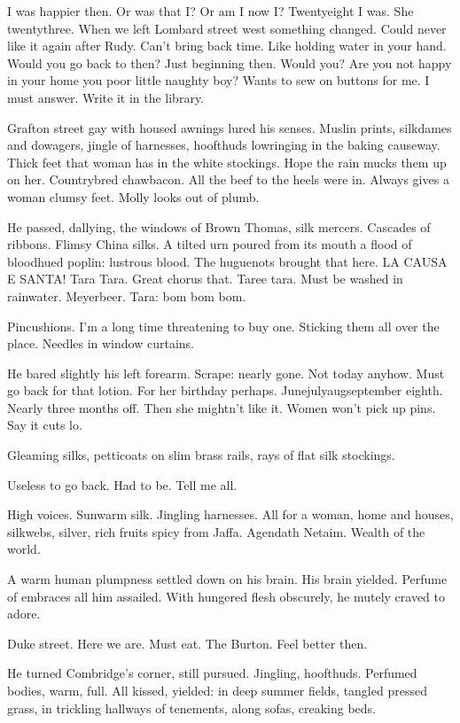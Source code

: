 I was happier then.
Or was that I?
Or am I now I?
Twentyeight I was.
She twentythree.
When we left Lombard street west something changed.
Could never like it again after Rudy.
Can't bring back time.
Like holding water in your hand.
Would you go back to then?
Just beginning then.
Would you?
Are you not happy in your home you poor little naughty boy?
Wants to sew on buttons for me.
I must answer.
Write it in the library.

Grafton street gay with housed awnings lured his senses.
Muslin prints, silkdames and dowagers,
jingle of harnesses,
hoofthuds lowringing in the baking causeway.
Thick feet that woman has in the white stockings.
Hope the rain mucks them up on her.
Countrybred chawbacon.
All the beef to the heels were in.
Always gives a woman clumsy feet.
Molly looks out of plumb.

He passed, dallying,
the windows of Brown Thomas, silk mercers.
Cascades of ribbons.
Flimsy China silks.
A tilted urn poured from its mouth a flood of bloodhued poplin:
lustrous blood.
The huguenots brought that here.
LA CAUSA E SANTA!
Tara Tara.
Great chorus that.
Taree tara.
Must be washed in rainwater.
Meyerbeer.
Tara:
bom bom bom.

Pincushions.
I'm a long time threatening to buy one.
Sticking them all over the place.
Needles in window curtains.

He bared slightly his left forearm.
Scrape: nearly gone.
Not today anyhow.
Must go back for that lotion.
For her birthday perhaps.
Junejulyaugseptember eighth.
Nearly three months off.
Then she mightn't like it.
Women won't pick up pins.
Say it cuts lo.

Gleaming silks,
petticoats on slim brass rails,
rays of flat silk stockings.

Useless to go back.
Had to be.
Tell me all.

High voices.
Sunwarm silk.
Jingling harnesses.
All for a woman,
home and houses,
silkwebs, silver,
rich fruits spicy from Jaffa.
Agendath Netaim.
Wealth of the world.

A warm human plumpness settled down on his brain.
His brain yielded.
Perfume of embraces all him assailed.
With hungered flesh obscurely,
he mutely craved to adore.

Duke street.
Here we are.
Must eat.
The Burton.
Feel better then.

He turned Combridge's corner, still pursued.
Jingling, hoofthuds.
Perfumed bodies, warm, full.
All kissed, yielded:
in deep summer fields,
tangled pressed grass,
in trickling hallways of tenements,
along sofas, creaking beds.

